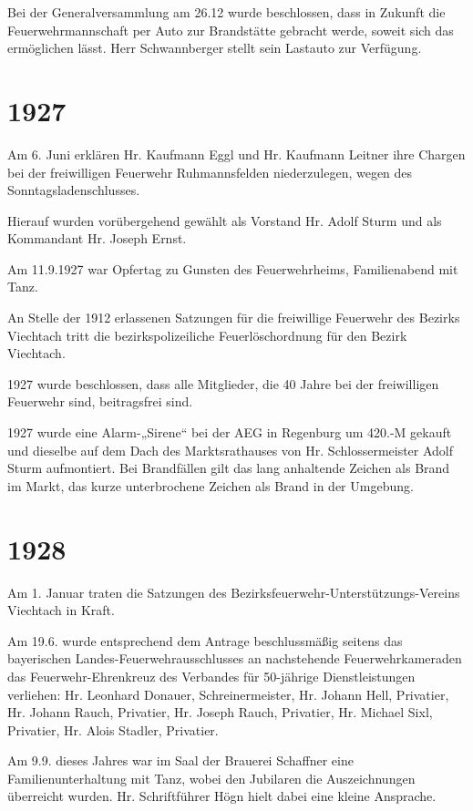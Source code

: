 \documentclass[12pt,a4paper]{book}
\begin{document}
Bei der Generalversammlung am 26.12 wurde beschlossen, dass in Zukunft die
Feuerwehrmannschaft per Auto zur Brandstätte gebracht werde, soweit sich das
ermöglichen lässt. Herr Schwannberger stellt sein Lastauto zur Verfügung.

\section*{1927}

Am 6. Juni erklären Hr. Kaufmann Eggl und Hr. Kaufmann Leitner ihre Chargen bei
der freiwilligen Feuerwehr Ruhmannsfelden niederzulegen, wegen des
Sonntagsladenschlusses.

Hierauf wurden vorübergehend gewählt als Vorstand Hr. Adolf Sturm und als
Kommandant Hr. Joseph Ernst.

Am 11.9.1927 war Opfertag zu Gunsten des Feuerwehrheims, Familienabend mit Tanz.

An Stelle der 1912 erlassenen Satzungen für die freiwillige Feuerwehr des
Bezirks Viechtach tritt die bezirkspolizeiliche Feuerlöschordnung für den Bezirk
Viechtach.

1927 wurde beschlossen, dass alle Mitglieder, die 40 Jahre bei der freiwilligen
Feuerwehr sind, beitragsfrei sind.

1927 wurde eine Alarm-„Sirene“ bei der AEG in Regenburg um 420.-M gekauft und
dieselbe auf dem Dach des Marktsrathauses von Hr. Schlossermeister Adolf Sturm
aufmontiert. Bei Brandfällen gilt das lang anhaltende Zeichen als Brand im
Markt, das kurze unterbrochene Zeichen als Brand in der Umgebung.

\section*{1928}

Am 1. Januar traten die Satzungen des Bezirksfeuerwehr-Unterstützungs-Vereins
Viechtach in Kraft.

Am 19.6. wurde entsprechend dem Antrage beschlussmäßig seitens das bayerischen
Landes-Feuerwehrausschlusses an nachstehende Feuerwehrkameraden das
Feuerwehr-Ehrenkreuz des Verbandes für 50-jährige Dienstleistungen verliehen:
Hr. Leonhard Donauer, Schreinermeister, Hr. Johann Hell, Privatier, Hr. Johann
Rauch, Privatier, Hr. Joseph Rauch, Privatier, Hr. Michael Sixl, Privatier, Hr.
Alois Stadler, Privatier.

Am 9.9. dieses Jahres war im Saal der Brauerei Schaffner eine
Familienunterhaltung mit Tanz, wobei den Jubilaren die Auszeichnungen überreicht
wurden. Hr. Schriftführer Högn hielt dabei eine kleine Ansprache.
\end{document}
